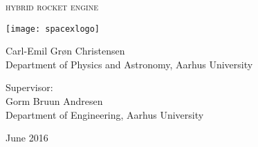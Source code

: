
\begin{titlingpage}

\begin{center}

\vspace*{0cm}
\huge
\textsc{hybrid rocket engine}\\
\vspace{1.5cm}

\texttt{[image: spacexlogo]}

\vspace{10cm}

\large
{
    Carl-Emil Grøn Christensen\\
    Department of Physics and Astronomy, Aarhus University
}

\vspace{1.5cm}

{
  Supervisor:\\
  Gorm Bruun Andresen\\
  Department of Engineering, Aarhus University
}

\vspace{1.5cm}
{June 2016}\\


\end{center}



\end{titlingpage}
